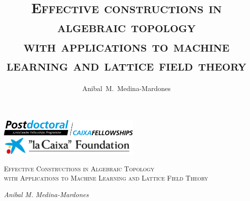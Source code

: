 \documentclass{article}
\title{\textsc{Effective constructions in algebraic topology \\ with applications to machine learning and lattice field theory}}
\author{Anibal~M.~Medina-Mardones}
\begin{document}
	\thispagestyle{empty}
	\fontsize{14}{1.15}

	\includegraphics[width=7cm]{aux/logo1.png}
	\hfill
	\includegraphics[width=7cm]{aux/logo3.png}

	\vspace*{1cm}

	\begin{center}
		\Large\textsc{Effective Constructions in Algebraic Topology \\ with Applications to Machine Learning and Lattice Field Theory} \par
		\vspace*{10pt}
		\Large\textit{Anibal M. Medina-Mardones}
		\vspace*{-5pt}
	\end{center}

	
	
	
	
	\newpage

	\printbibliography
\end{document}

